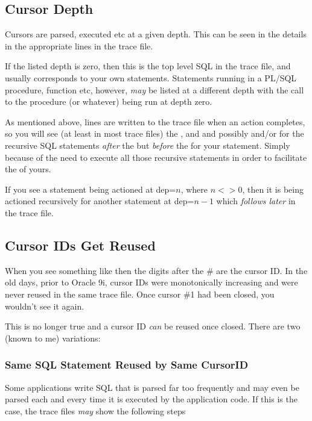 \subsection{Cursor Depth}

Cursors are parsed, executed etc at a given depth. This can be seen in the  details in the appropriate lines in the trace file.

If the listed depth is zero, then this is the top level SQL in the trace file, and usually corresponds to your own statements. Statements running in a PL/SQL procedure, function etc, however, \emph{may} be listed at a different depth with the call to the procedure (or whatever) being run at depth zero.

As mentioned above, lines are written to the trace file when an action completes, so you will see (at least in most trace files) the ,  and  and possibly  and/or  for the recursive SQL statements \emph{after} the  but \emph{before} the  for your statement. Simply because of the need to execute all those recursive statements in order to facilitate the  of yours.

If you see a statement being actioned at dep=$n$, where $n <> 0$, then it is being actioned recursively for another statement at dep=$n-1$ which \emph{follows later} in the trace file.

\subsection{Cursor IDs Get Reused}

When you see something like  then the digits after the \# are the cursor ID. In the old days, prior to Oracle 9i, cursor IDs were monotonically increasing and were never reused in the same trace file. Once cursor \#1 had been closed, you wouldn't see it again.

This is no longer true and a cursor ID \emph{can} be reused once closed. There are two (known to me) variations:

\subsubsection{Same SQL Statement Reused by Same CursorID}

Some applications write SQL that is parsed far too frequently and may even be parsed each and every time it is executed by the application code. If this is the case, the trace files \emph{may} show the following steps

